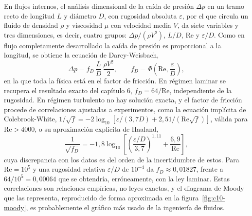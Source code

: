 \documentclass[10pt,openany]{book}
\begin{document}
En flujos internos, el análisis dimensional de la caída de presión \(\Delta p\) en un tramo recto de longitud \(L\) y diámetro \(D\), con rugosidad absoluta \(\varepsilon\), por el que circula un fluido de densidad \(\rho\) y viscosidad \(\mu\) con velocidad media \(V\), da siete variables y tres dimensiones, es decir, cuatro grupos: \(\Delta p/(\rho V^{2})\), \(L/D\), \(\mathrm{Re}\) y \(\varepsilon/D\). Como en flujo completamente desarrollado la caída de presión es proporcional a la longitud, se obtiene la ecuación de Darcy-Weisbach,
\begin{equation}
\Delta p = f_D\,\frac{L}{D}\,\frac{\rho V^{2}}{2}, \qquad f_D = \Phi\!\left(\mathrm{Re}, \frac{\varepsilon}{D}\right), \label{eq:c10-darcy}
\end{equation}
en la que toda la física está en el factor de fricción. En régimen laminar se recupera el resultado exacto del capítulo 6, \(f_D = 64/\mathrm{Re}\), independiente de la rugosidad. En régimen turbulento no hay solución exacta, y el factor de fricción procede de correlaciones ajustadas a experimentos, como la ecuación implícita de Colebrook-White, \(1/\sqrt{f} = -2\log_{10}[\varepsilon/(3{,}7D) + 2{,}51/(\mathrm{Re}\sqrt{f})]\), válida para \(\mathrm{Re} > 4000\), o su aproximación explícita de Haaland,
\begin{equation}
\frac{1}{\sqrt{f_D}} = -1{,}8\log_{10}\!\left[\left(\frac{\varepsilon/D}{3{,}7}\right)^{1{,}11} + \frac{6{,}9}{\mathrm{Re}}\right], \label{eq:c10-haaland}
\end{equation}
cuya discrepancia con los datos es del orden de la incertidumbre de estos. Para \(\mathrm{Re} = 10^{5}\) y una rugosidad relativa \(\varepsilon/D\) de \(10^{-4}\) da \(f_D \approx 0{,}01827\), frente a \(64/10^{5} = 0{,}00064\) que se obtendría, erróneamente, con la ley laminar. Estas correlaciones son relaciones empíricas, no leyes exactas, y el diagrama de Moody que las representa, reproducido de forma aproximada en la figura~\ref{fig:c10-moody}, es probablemente el gráfico más usado de la ingeniería de fluidos.
\end{document}
